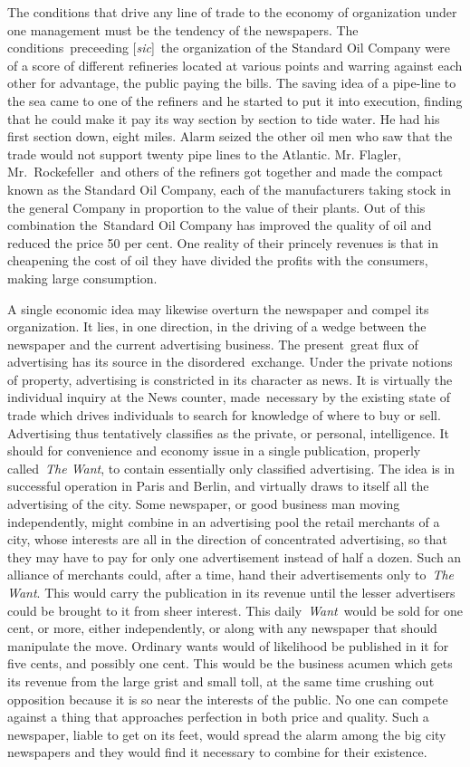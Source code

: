 \documentclass[openany,nobib]{tufte-book}
\begin{document}
The conditions that drive any line of trade to the economy of
organization under one management must be the tendency of the
newspapers. The conditions~preceeding {[}\emph{sic}{]}~the organization
of the Standard Oil Company were of a score of different refineries
located at various points and warring against each other for advantage,
the public paying the bills. The saving idea of a pipe-line to the sea
came to one of the refiners and he started to put it into execution,
finding that he could make it pay its way section by section to tide
water. He had his first section down, eight miles. Alarm seized the
other oil men who saw that the trade would not support twenty pipe lines
to the Atlantic. Mr. Flagler, Mr.~Rockefeller~and others of the refiners
got together and made the compact known as the Standard Oil Company,
each of the manufacturers taking stock in the general Company in
proportion to the value of their plants. Out of this combination
the~Standard Oil Company has improved the quality of oil and reduced the
price 50 per cent. One reality of their princely revenues is that in
cheapening the cost of oil they have divided the profits with the
consumers, making large consumption.~

A single economic idea may likewise overturn the newspaper and compel
its organization. It lies, in one direction, in the driving of a wedge
between the newspaper and the current advertising business. The
present~great flux of advertising has its source in the
disordered~exchange. Under the private notions of property, advertising
is constricted in its character as news. It is virtually the individual
inquiry at the News counter, made~necessary by the existing state of
trade which drives individuals to search for knowledge of where to buy
or sell. Advertising thus tentatively classifies as the private, or
personal, intelligence. It should for convenience and economy issue in a
single publication, properly called~\emph{The Want}, to contain
essentially only classified advertising. The idea is in successful
operation in Paris and Berlin, and virtually draws to itself all the
advertising of the city. Some newspaper, or good business man moving
independently, might combine in an advertising pool the retail merchants
of a city, whose interests are all in the direction of concentrated
advertising, so that they may have to pay for only one advertisement
instead of half a dozen. Such an alliance of merchants could, after a
time, hand their advertisements only to~\emph{The Want}. This would
carry the publication in its revenue until the lesser advertisers could
be brought to it from sheer interest. This daily~\emph{Want~}would be
sold for one cent, or more, either independently, or along with any
newspaper that should manipulate the move. Ordinary wants would of
likelihood be published in it for five cents, and possibly one cent.
This would be the business acumen which gets its revenue from the large
grist and small toll, at the same time crushing out opposition because
it is so near the interests of the public. No one can compete against a
thing that approaches perfection in both price and quality. Such a
newspaper, liable to get on its feet, would spread the alarm among the
big city newspapers and they would find it necessary to combine for
their existence.~
\end{document}
